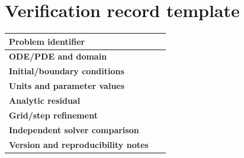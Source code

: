 \documentclass[11pt,letterpaper,oneside]{report}
\theoremstyle{definition}\newtheorem{definition}[theorem]{Definition}
\theoremstyle{remark}\newtheorem{remark}[theorem]{Remark}
\begin{document}
\section*{Verification record template}
\begin{tabularx}{\textwidth}{>{\bfseries}p{}X}\toprule
Problem identifier & \rule{0pt}{15pt}\ \\ \midrule
ODE/PDE and domain & \\[8pt]
Initial/boundary conditions & \\[8pt]
Units and parameter values & \\[8pt]
Analytic residual & \\ [8pt]
Grid/step refinement & \\ [8pt]
Independent solver comparison & \\ [8pt]
Version and reproducibility notes & \\ [8pt]\bottomrule
\end{tabularx}
\end{document}
